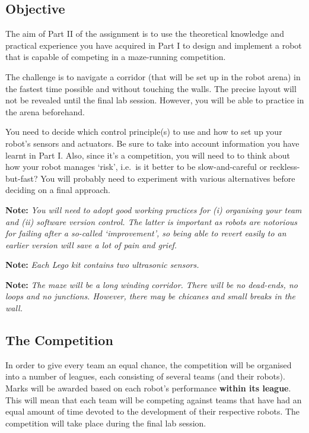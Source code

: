 \documentclass[hidelinks,a4paper,11pt]{article}
\begin{document}
	\subsection{Objective}
	
	The aim of Part II of the assignment is to use the theoretical knowledge and practical experience you have acquired in Part I to design and implement a robot that is capable of competing in a maze-running competition.
	
	The challenge is to navigate a corridor (that will be set up in the robot arena) in the fastest time possible and without touching the walls.  The precise layout will not be revealed until the final lab session.  However, you will be able to practice in the arena beforehand.
	
	You need to decide which control principle(s) to use and how to set up your robot's sensors and actuators.  Be sure to take into account information you have learnt in Part I.  Also, since it's a competition, you will need to to think about how your robot manages `risk', i.e.\ is it better to be slow-and-careful or reckless-but-fast?  You will probably need to experiment with various alternatives before deciding on a final approach.
	
	{\bfseries Note:}  \emph{You will need to adopt good working practices for (i) organising your team and (ii) software version control.  The latter is important as robots are notorious for failing after a so-called `improvement', so being able to revert easily to an earlier version will save a lot of pain and grief.}
	
	{\bfseries Note:}  \emph{Each Lego kit contains two ultrasonic sensors.}
	
	{\bfseries Note:}  \emph{The maze will be a long winding corridor.  There will be no dead-ends, no loops and no junctions.  However, there may be chicanes and small breaks in the wall.}
	
	
	\subsection{The Competition}
	
	In order to give every team an equal chance, the competition will be organised into a number of leagues, each consisting of several teams (and their robots).  Marks will be awarded based on each robot's performance \textbf{within its league}.  This will mean that each team will be competing against teams that have had an equal amount of time devoted to the development of their respective robots.  The competition will take place during the final lab session.
	
\end{document}
